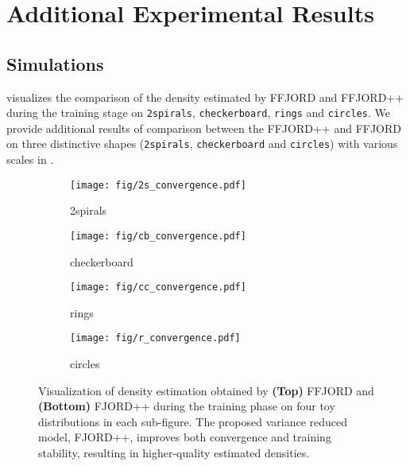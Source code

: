 \section{Additional Experimental Results}
\subsection{Simulations}
 visualizes the comparison of the density estimated by FFJORD and FFJORD++ during the training stage on \texttt{2spirals}, \texttt{checkerboard}, \texttt{rings} and \texttt{circles}.
We provide additional results of comparison between the FFJORD++ and FFJORD on three distinctive shapes (\texttt{2spirals}, \texttt{checkerboard} and \texttt{circles}) with various scales in .
\begin{figure}[!t]
    \centering
    \begin{subfigure}[b]{0.48\textwidth}
        \centering
        \texttt{[image: fig/2s\_convergence.pdf]}
        \caption{2spirals}
        \label{fig: 2s}
    \end{subfigure}
    \hfill
    \begin{subfigure}[b]{0.48\textwidth}
        \centering
        \texttt{[image: fig/cb\_convergence.pdf]}
        \caption{checkerboard}
        \label{fig: cb}
    \end{subfigure}
    \begin{subfigure}[b]{0.48\textwidth}
        \centering
        \texttt{[image: fig/cc\_convergence.pdf]}
        \caption{rings}
        \label{fig: 2s}
    \end{subfigure}
    \hfill
    \begin{subfigure}[b]{0.48\textwidth}
        \centering
        \texttt{[image: fig/r\_convergence.pdf]}
        \caption{circles}
        \label{fig: cb}
    \end{subfigure}
    
    \caption{\small Visualization of density estimation obtained by \textbf{(Top)} FFJORD and \textbf{(Bottom)} FJORD++ during the training phase on four toy distributions in each sub-figure. The proposed variance reduced model, FJORD++, improves both convergence and training stability, resulting in higher-quality estimated densities.}
    \label{fig: ap_vis_train}
\end{figure}

